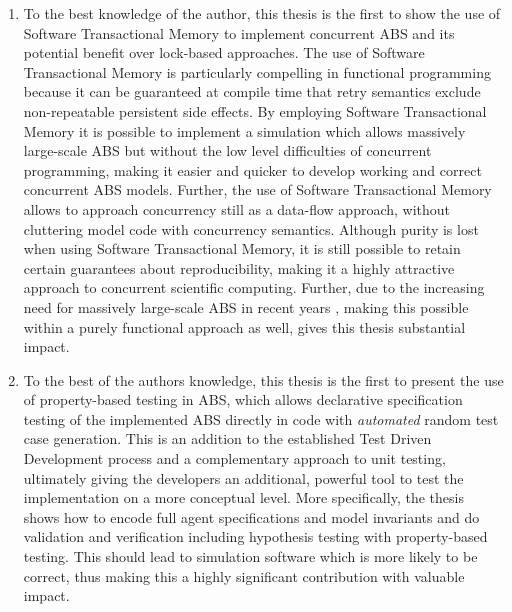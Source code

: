 \begin{enumerate}
	\item To the best knowledge of the author, this thesis is the first to show the use of Software Transactional Memory to implement concurrent ABS and its potential benefit over lock-based approaches. The use of Software Transactional Memory is particularly compelling in functional programming because it can be guaranteed at compile time that retry semantics exclude non-repeatable persistent side effects. By employing Software Transactional Memory it is possible to implement a simulation which allows massively large-scale ABS but without the low level difficulties of concurrent programming, making it easier and quicker to develop working and correct concurrent ABS models. Further, the use of Software Transactional Memory allows to approach concurrency still as a data-flow approach, without cluttering model code with concurrency semantics. Although purity is lost when using Software Transactional Memory, it is still possible to retain certain guarantees about reproducibility, making it a highly attractive approach to concurrent scientific computing. Further, due to the increasing need for massively large-scale ABS in recent years \cite{lysenko_framework_2008}, making this possible within a purely functional approach as well, gives this thesis substantial impact.
	
	\item To the best of the authors knowledge, this thesis is the first to present the use of property-based testing in ABS, which allows declarative specification testing of the implemented ABS directly in code with \textit{automated} random test case generation. This is an addition to the established Test Driven Development process and a complementary approach to unit testing, ultimately giving the developers an additional, powerful tool to test the implementation on a more conceptual level. More specifically, the thesis shows how to encode full agent specifications and model invariants and do validation and verification including hypothesis testing with property-based testing. This should lead to simulation software which is more likely to be correct, thus making this a highly significant contribution with valuable impact.

\end{enumerate}

